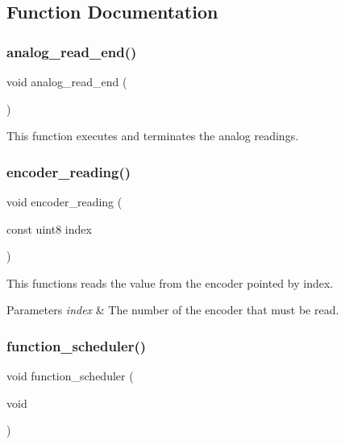 \subsection{Function Documentation}
\mbox{\label{interruptions_8c_a00a8d34962a63161405e5d7785b9625e}} 
\subsubsection{analog\+\_\+read\+\_\+end()}
{\footnotesize\ttfamily void analog\+\_\+read\+\_\+end (\begin{DoxyParamCaption}{ }\end{DoxyParamCaption})}

This function executes and terminates the analog readings. \mbox{\label{interruptions_8c_af8d2e8be60bb142650c4fcf4b782fb14}} 
\subsubsection{encoder\+\_\+reading()}
{\footnotesize\ttfamily void encoder\+\_\+reading (\begin{DoxyParamCaption}\item[{const uint8}]{index }\end{DoxyParamCaption})}

This functions reads the value from the encoder pointed by index.


\begin{DoxyParams}{Parameters}
{\em index} & The number of the encoder that must be read. \\
\hline
\end{DoxyParams}
\mbox{\label{interruptions_8c_a39df971c4e9f194be50c54dfd7aeabfe}} 
\subsubsection{function\+\_\+scheduler()}
{\footnotesize\ttfamily void function\+\_\+scheduler (\begin{DoxyParamCaption}\item[{void}]{ }\end{DoxyParamCaption})}

